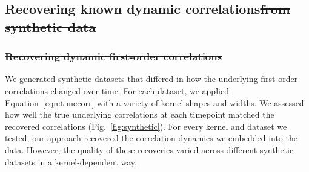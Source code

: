 \documentclass[english]{article}
\providecommand{\DIFaddtex}[1]{{\protect\color{blue}\uwave{#1}}} %
\providecommand{\DIFdeltex}[1]{{\protect\color{red}\sout{#1}}}                      %
\providecommand{\DIFaddbegin}{} %
\providecommand{\DIFaddend}{} %
\providecommand{\DIFdelbegin}{} %
\providecommand{\DIFdelend}{} %
\providecommand{\DIFadd}[1]{\texorpdfstring{\DIFaddtex{#1}}{#1}} %
\providecommand{\DIFdel}[1]{\texorpdfstring{\DIFdeltex{#1}}{}} %
\newcommand{\DIFscaledelfig}{0.5}
\newlength{\DIFdelgraphicswidth} %
\newlength{\DIFdelgraphicsheight} %
\newcommand{\DIFaddincludegraphics}[2][]{{\color{blue}\fbox{\DIFOincludegraphics[#1]{#2}}}} %
\newcommand{\DIFdelincludegraphics}[2][]{%
\sbox{\DIFdelgraphicsbox}{\DIFOincludegraphics[#1]{#2}}%
\settoboxwidth{\DIFdelgraphicswidth}{\DIFdelgraphicsbox} %
\settoboxtotalheight{\DIFdelgraphicsheight}{\DIFdelgraphicsbox} %
\scalebox{\DIFscaledelfig}{%
\parbox[b]{\DIFdelgraphicswidth}{\usebox{\DIFdelgraphicsbox}\\[-\baselineskip] \rule{\DIFdelgraphicswidth}{0em}}\llap{\resizebox{\DIFdelgraphicswidth}{\DIFdelgraphicsheight}{%
\setlength{\unitlength}{\DIFdelgraphicswidth}%
\begin{picture}(1,1)%
\thicklines\linethickness{2pt} %
{\color[rgb]{1,0,0}\put(0,0){\framebox(1,1){}}}%
{\color[rgb]{1,0,0}\put(0,0){\line( 1,1){1}}}%
{\color[rgb]{1,0,0}\put(0,1){\line(1,-1){1}}}%
\end{picture}%
}\hspace*{3pt}}} %
} %
\DeclareRobustCommand{\DIFaddbegin}{\DIFOaddbegin \let\includegraphics\DIFaddincludegraphics} %
\DeclareRobustCommand{\DIFaddend}{\DIFOaddend \let\includegraphics\DIFOincludegraphics} %
\DeclareRobustCommand{\DIFdelbegin}{\DIFOdelbegin \let\includegraphics\DIFdelincludegraphics} %
\DeclareRobustCommand{\DIFdelend}{\DIFOaddend \let\includegraphics\DIFOincludegraphics} %
\begin{document}
\subsection*{Recovering known dynamic \DIFaddbegin \DIFadd{first-order }\DIFaddend correlations\DIFdelbegin \DIFdel{from synthetic
  data}\DIFdelend }
\DIFdelbegin \subsubsection*{\DIFdel{Recovering dynamic first-order correlations}}
\DIFdelend We generated synthetic datasets that differed in how the underlying first-order
correlations changed over time.  For each dataset, we applied
Equation~\ref{eqn:timecorr} with a variety of kernel shapes and
widths.  We assessed how well the true underlying correlations at each
timepoint matched the recovered correlations
(Fig.~\ref{fig:synthetic}).  For every kernel and dataset we tested,
our approach recovered the correlation dynamics we embedded into the
data.  However, the quality of these recoveries varied across
different synthetic datasets in a kernel-dependent way.
\end{document}
